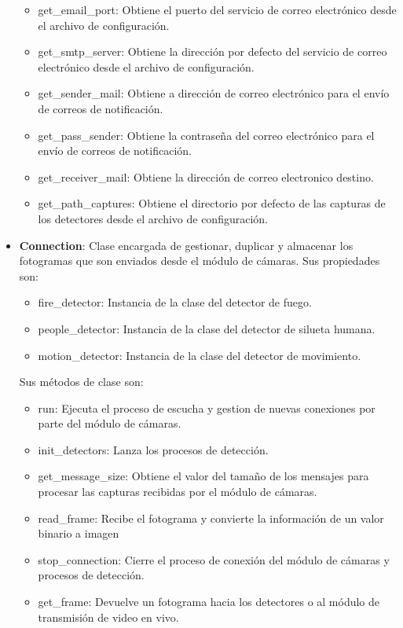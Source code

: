 \begin{itemize}
\begin{itemize}
            \item get\_email\_port: Obtiene el puerto del servicio de correo electrónico desde el archivo de configuración.
            \item get\_smtp\_server: Obtiene la dirección por defecto del servicio de correo electrónico desde el archivo de configuración.
            \item get\_sender\_mail: Obtiene a dirección de correo electrónico para el envío de correos de notificación. 
            \item get\_pass\_sender: Obtiene la contraseña del correo electrónico para el envío de correos de notificación. 
            \item get\_receiver\_mail: Obtiene la dirección de correo electronico destino.
            \item get\_path\_captures: Obtiene el directorio por defecto de las capturas de los detectores desde el archivo de configuración.
        \end{itemize}
    \item \textbf{Connection}: Clase encargada de gestionar, duplicar y almacenar los fotogramas que son enviados desde el módulo de cámaras. Sus propiedades son:
        \begin{itemize}
            \item fire\_detector: Instancia de la clase del detector de fuego.
            \item people\_detector: Instancia de la clase del detector de silueta humana.
            \item motion\_detector: Instancia de la clase del detector de movimiento.
        \end{itemize}
        Sus métodos de clase son:
        \begin{itemize}
            \item run: Ejecuta el proceso de escucha y gestion de nuevas conexiones por parte del módulo de cámaras.
            \item init\_detectors: Lanza los procesos de detección.
            \item get\_message\_size: Obtiene el valor del tamaño de los mensajes para procesar las capturas recibidas por el módulo de cámaras.
            \item read\_frame: Recibe el fotograma y convierte la información de un valor binario a imagen
            \item stop\_connection: Cierre el proceso de conexión del módulo de cámaras y procesos de detección.
            \item get\_frame: Devuelve un fotograma hacia los detectores o al módulo de transmisión de video en vivo.

\end{itemize}
\end{itemize}
